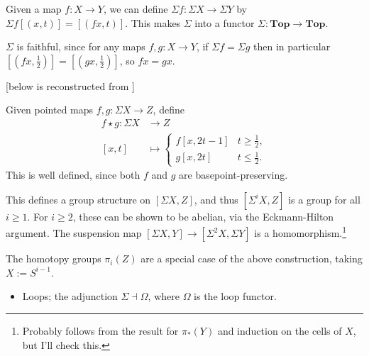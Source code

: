 \documentclass{MetricNotes2023}
\begin{document}
Given a map \(f : X \to Y\), we can define \(\Sigma f : \Sigma X \to \Sigma Y\) by \(\Sigma f[(x, t)]=[(fx, t)]\). This makes \(\Sigma \) into a functor \(\Sigma : \textbf{Top}\to \textbf{Top}\). 

\begin{remark}\label{2502141442}
\(\Sigma\) is faithful, since for any maps \(f, g : X\to Y\), if \(\Sigma f = \Sigma g\) then in particular \([(fx, \frac{1}{2})]=[(gx, \frac{1}{2})]\), so \(fx=gx\). 
\end{remark}  

[below is reconstructed from  \autocite{mazelgee}]

Given pointed maps \(f, g : \Sigma X \to Z\), define 
\begin{align*}
f \star g : \Sigma X &\to Z\\
[x,t]&\mapsto \begin{cases}
f[x,2t-1] & t \geq \frac{1}{2},\\
g[x,2t] &t\leq \frac{1}{2}.
\end{cases}
\end{align*}
This is well defined, since both \(f\) and \(g\) are basepoint-preserving. %

\begin{remark}\label{2504091052}
This defines a group structure on \([\Sigma X, Z]\), and thus \([\Sigma^i X, Z]\) is a group for all \(i\geq 1\). For \(i\geq 2\), these can be shown to be abelian, via the Eckmann-Hilton argument. The suspension map \([\Sigma X, Y]\to [\Sigma^2X, \Sigma Y]\) is a homomorphism.\footnote{Probably follows from the result for \(\pi_*(Y)\) and induction on the cells of \(X\), but I'll check this.}
\end{remark}

\begin{remark}\label{2502200937}
The homotopy groups \(\pi_i(Z)\) are a special case of the above construction, taking \(X:=S^{i-1}\). 
\end{remark}


\begin{itemize}
\item Loops; the adjunction \(\Sigma \dashv \Omega\), where \(\Omega\) is the loop functor.
\end{itemize}
\end{document}
